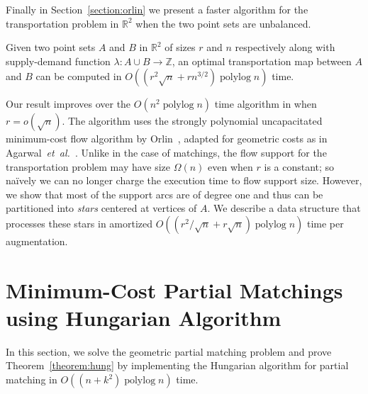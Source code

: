 \documentclass[a4paper,UKenglish]{socg-lipics-v2018}
\makeatletter
\def\etal{\emph{et~al.}}
\def\etal{\textit{et~al.}}
\def\polylog{\mathop{\mathrm{polylog}}}
\def\reals{\mathbb{R}}
\def\ints{\mathbb{Z}}
\def\tsupply{\lambda}
\theoremstyle{plain}
\numberwithin{figure}{section}
\def\n@te#1{\textsf{\boldmath \textbf{$\langle\!\langle$#1$\rangle\!\rangle$}}\leavevmode}
\def\note#1{\textcolor{red}{\n@te{#1}}}
\makeatother
\begin{document}
\medskip

Finally in Section~\ref{section:orlin} we present a faster algorithm for the
transportation problem in $\reals^2$ when the two point sets are unbalanced.

\begin{theorem}
\label{theorem:orlin}
Given two point sets $A$ and $B$ in $\reals^2$ of sizes $r$ and $n$ respectively
along with supply-demand function $\tsupply:A \cup B \to \ints$,
an optimal transportation map between $A$ and $B$ can be computed in
$O((r^2\sqrt{n} + rn^{3/2})\polylog n)$ time.
\end{theorem}

Our result improves over the $O(n^2\polylog n)$ time algorithm in
\cite{AFPVX17} when $r = o(\sqrt{n})$.
The algorithm uses the strongly polynomial uncapacitated minimum-cost
flow algorithm by Orlin~\cite{O93}, adapted for geometric costs as in
Agarwal~\etal~\cite{AFPVX17}.
Unlike in the case of matchings, the flow support for the transportation problem may have size $\Omega(n)$
even when $r$ is a constant; so na\"ively we can no longer charge the execution time to flow support size.
However, we show that most of the support arcs are of degree one and thus can be partitioned
into \emph{stars} centered at vertices of $A$.
We describe a data structure that processes these stars in amortized
$O((r^2/\sqrt{n} + r\sqrt{n})\polylog n)$ time per augmentation.

\section{Minimum-Cost Partial Matchings using Hungarian Algorithm}
\label{section:hung}

In this section, we solve the geometric partial matching problem and prove Theorem~\ref{theorem:hung} by implementing the Hungarian algorithm for partial matching in $O((n + k^2)\polylog n)$ time.

\end{document}
